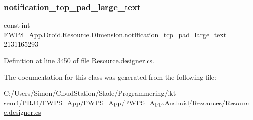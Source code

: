\subsubsection{\texorpdfstring{notification\+\_\+top\+\_\+pad\+\_\+large\+\_\+text}{notification\_top\_pad\_large\_text}}
{\footnotesize\ttfamily const int F\+W\+P\+S\+\_\+\+App.\+Droid.\+Resource.\+Dimension.\+notification\+\_\+top\+\_\+pad\+\_\+large\+\_\+text = 2131165293}



Definition at line 3450 of file Resource.\+designer.\+cs.



The documentation for this class was generated from the following file\+:\begin{DoxyCompactItemize}
\item 
C\+:/\+Users/\+Simon/\+Cloud\+Station/\+Skole/\+Programmering/ikt-\/sem4/\+P\+R\+J4/\+F\+W\+P\+S\+\_\+\+App/\+F\+W\+P\+S\+\_\+\+App/\+F\+W\+P\+S\+\_\+\+App.\+Android/\+Resources/\mbox{\hyperlink{_resource_8designer_8cs}{Resource.\+designer.\+cs}}\end{DoxyCompactItemize}
